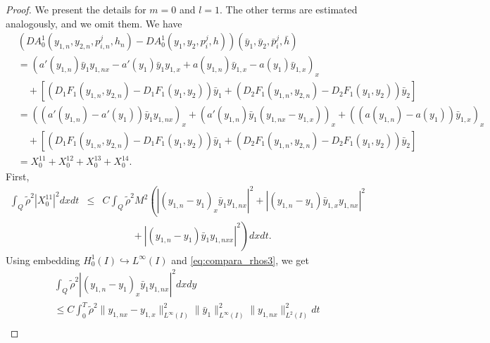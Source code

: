\documentclass[11pt,a4paper]{amsart}
\numberwithin{equation}{section}
\begin{document}
\begin{proof}
    We present the details for $m=0$ and $l=1$. The other terms are estimated analogously, and we omit them. We have
    \begin{equation*}
        \begin{split}
    	   &(D A^1_0(y_{1,n},y_{2,n},p^{j}_{i,n},h_{n})-D A^1_0( y_1, y_2, p_i^j, h))(\bar y_1,\bar y_2,\bar p_i^j,\bar h)\\
           &= \left(a'(y_{1,n})\bar y_{1} y_{1,nx} - a'(y_{1})\bar y_{1} y_{1,x} + a(y_{1,n}) \bar y_{1,x} - a(y_1) \bar y_{1,x} \right)_x \\
           &\quad + [ (D_1 F_1(y_{1,n},y_{2,n})-D_1 F_1(y_1,y_2))\bar y_1 + (D_2 F_1(y_{1,n},y_{2,n})-D_2 F_1(y_1,y_2))\bar y_2] \\
           &= ((a'(y_{1,n})-a'(y_{1}))\bar y_{1} y_{1,nx})_x + (a'(y_{1,n})\bar y_{1} (y_{1,nx}-y_{1,x}))_x + ((a(y_{1,n})-a(y_{1})) \bar y_{1,x})_x \\&\quad + [ (D_1 F_1(y_{1,n},y_{2,n})-D_1 F_1(y_1,y_2))\bar y_1 + (D_2 F_1(y_{1,n},y_{2,n})-D_2 F_1(y_1,y_2))\bar y_2] \\
           &= X_0^{11}+X_0^{12}+X_0^{13}+X_0^{14}.
        \end{split}
    \end{equation*}First, 
    \begin{eqnarray*}
        \int_{Q} \tilde\rho^{2}|X_{0}^{11}|^{2} dxdt
    	&\leq&C\int_{Q} \tilde\rho^{2} M^2 \left( \left|(y_{1,n}-y_1)_x \bar y_1 y_{1,nx} \right|^2 + \left|(y_{1,n}-y_1) \bar y_{1,x} y_{1,nx}  \right|^2 \right. \\
        &&\left. \qquad\quad +\left|(y_{1,n}-y_1) \bar y_1 y_{1,nxx} \right|^2 \right) dxdt.
    \end{eqnarray*}
    Using embedding $H^1_0(I) \hookrightarrow L^\infty(I)$ and %
    \eqref{eq:compara_rhos3}, we get
    \begin{equation*}
        \begin{split}
            &\int_{Q} \tilde\rho^{2} \left|(y_{1,n}-y_1)_x \bar y_1 y_{1,nx} \right|^2 dx dy \\
            &\leq C\int_0^T \tilde\rho^{2} \|y_{1,nx}-y_{1,x}\|_{L^\infty(I)}^2 \|\bar y_1\|_{L^\infty(I)}^2 \|y_{1,nx}\|_{L^2(I)}^2 dt \\

\end{split}
\end{equation*}
\end{proof}
\end{document}
